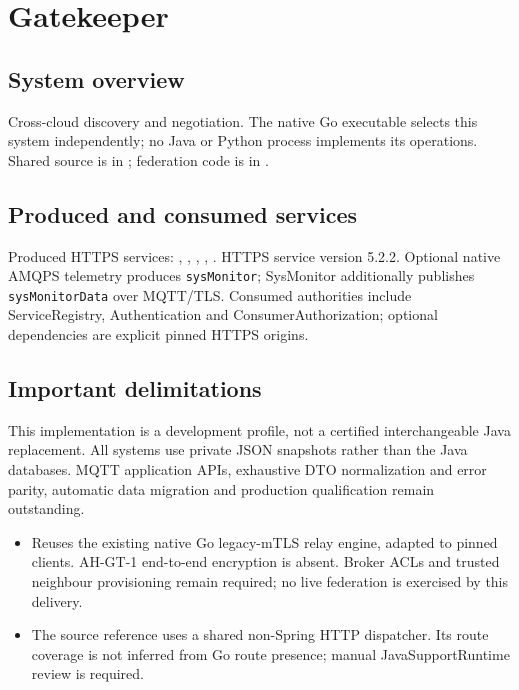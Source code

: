 \documentclass[a4paper]{arrowhead}
\begin{document}
\ArrowheadSetup
\section{Gatekeeper}
\subsection{System overview}
Cross-cloud discovery and negotiation. The native Go executable selects this system independently; no Java or Python process implements its operations. Shared source is in ; federation code is in .
\subsection{Produced and consumed services}
Produced HTTPS services: , \allowbreak {}, \allowbreak {}, \allowbreak {}, \allowbreak {}.
HTTPS service version 5.2.2. Optional native AMQPS telemetry produces \texttt{sysMonitor}; SysMonitor additionally publishes \texttt{sysMonitorData} over MQTT/TLS. Consumed authorities include ServiceRegistry, Authentication and ConsumerAuthorization; optional dependencies are explicit pinned HTTPS origins.
\subsection{Important delimitations}
This implementation is a development profile, not a certified interchangeable Java replacement. All systems use private JSON snapshots rather than the Java databases. MQTT application APIs, exhaustive DTO normalization and error parity, automatic data migration and production qualification remain outstanding.
\begin{itemize}
\item Reuses the existing native Go legacy-mTLS relay engine, adapted to pinned clients. AH-GT-1 end-to-end encryption is absent. Broker ACLs and trusted neighbour provisioning remain required; no live federation is exercised by this delivery.
\item The source reference uses a shared non-Spring HTTP dispatcher. Its route coverage is not inferred from Go route presence; manual JavaSupportRuntime review is required.
\end{itemize}
\end{document}
